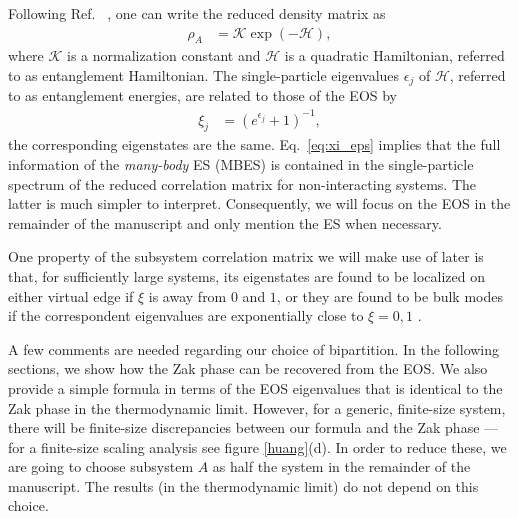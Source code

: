 \documentclass[twocolumn,amsmath,longbibliography,amssymb,superscriptaddress]{revtex4-1}
\newcommand{\mariac}[1]{{\it\color{cyan}#1}}
\begin{document}
Following Ref.~\cite{Peschel2003,Peschel2008} , one can write the  reduced density matrix as 
\begin{align}\label{eq:red_dens_mat}
\rho_A&=\mathcal{K} \exp(-\mathcal H),
\end{align}
where $\mathcal{K}$ is a normalization constant and $\mathcal{H}$ is a quadratic Hamiltonian, referred to as entanglement Hamiltonian. 
The single-particle eigenvalues $\epsilon_j$ of $\mathcal{H}$, referred to as entanglement energies,  are related to those of the EOS by 
\begin{align}\label{eq:xi_eps}
\xi_j &=\left(e^{\epsilon_j}+1\right)^{-1}, 
\end{align}
the corresponding eigenstates are the same. 
Eq.~\eqref{eq:xi_eps} implies that the full information of the \emph{many-body} ES (MBES) is contained in the single-particle spectrum of the reduced correlation matrix for non-interacting systems. 
The latter is much simpler to interpret. 
Consequently, we will focus on the EOS in the remainder of the manuscript and only mention the ES when necessary. 

One property of the subsystem correlation matrix we will make use of later is that, for sufficiently large systems, its eigenstates are found to be localized on either virtual edge if $\xi$ is away from $0$ and $1$, or they are found to be bulk modes if the correspondent eigenvalues are exponentially close to $\xi = 0,1$ \cite{Peschel2008}.




A few comments are needed regarding our choice of  bipartition. 
In the following sections, we show how the Zak phase can be recovered from the EOS.
We also provide a simple formula in terms of the EOS eigenvalues that is identical to the Zak phase in the thermodynamic limit.  
However, for a generic, finite-size system, there will be finite-size discrepancies between our formula and the Zak phase --- for a finite-size scaling analysis see figure \ref{huang}(d). 
In order to reduce these, we are going to choose subsystem $A$ as half the system in the remainder of the manuscript.
The results (in the thermodynamic limit) do not depend on this choice. 
\end{document}
